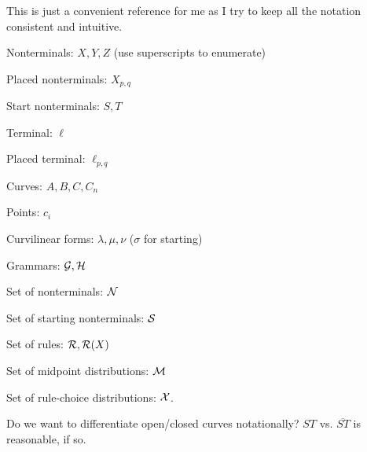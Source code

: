 
This is just a convenient reference for me as I try to keep all the
notation consistent and intuitive.

\bitem
\item Nonterminals: $X,Y,Z$ (use superscripts to enumerate)
\item Placed nonterminals: $X_{p,q}$
\item Start nonterminals: $S,T$
\item Terminal: $\ell$
\item Placed terminal: $\ell_{p,q}$
\item Curves: $A,B,C, C_n$
\item Points: $c_i$
\item Curvilinear forms: $\lambda, \mu, \nu$ ($\sigma$ for starting)
\item Grammars: ${\mathcal G}, {\mathcal H}$
\item Set of nonterminals: ${\mathcal N}$
\item Set of starting nonterminals: ${\mathcal S}$
\item Set of rules: ${\mathcal R}, {\mathcal R}(X)$
\item Set of midpoint distributions: ${\mathcal M}$
\item Set of rule-choice distributions: ${\mathcal X}$.
\item Do we want to differentiate open/closed curves notationally?
$ST$ vs. $\overline{ST}$ is reasonable, if so.
\eitem
